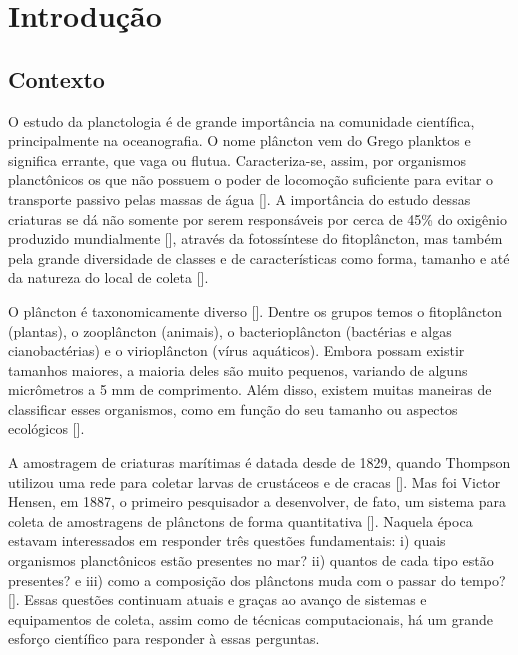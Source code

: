 \chapter{Introdução}
\label{cap:introducao}


\section{Contexto}
\label{sec:intro_contexto}



O estudo da planctologia é de grande importância na comunidade científica, principalmente na oceanografia. O nome plâncton vem do Grego planktos e significa errante, que vaga ou flutua. Caracteriza-se, assim, por organismos planctônicos os que não possuem o poder de locomoção suficiente para evitar o transporte passivo pelas massas de água [\cite{calazans2011organismos}].  A importância do estudo dessas criaturas se dá não somente por serem responsáveis por cerca de 45\% do oxigênio produzido mundialmente [\cite{brierleyplankton}],  através da fotossíntese do fitoplâncton, mas também pela grande diversidade de classes e de características como forma, tamanho e até da natureza do local de coleta [\cite{calazans2011organismos}]. 

O plâncton é taxonomicamente diverso [\cite{brierleyplankton}]. Dentre os grupos temos o fitoplâncton (plantas), o zooplâncton (animais), o bacterioplâncton (bactérias e algas cianobactérias) e o virioplâncton (vírus aquáticos). Embora possam existir tamanhos maiores, a maioria deles são muito pequenos, variando de alguns micrômetros a 5 mm de comprimento. Além disso, existem muitas maneiras de classificar esses organismos, como em função do seu tamanho ou aspectos ecológicos [\cite{calazans2011organismos}].


A amostragem de criaturas marítimas é datada desde de 1829, quando Thompson utilizou uma rede para coletar larvas de crustáceos e de cracas [\cite{brierleyplankton}]. Mas foi Victor Hensen, em 1887, o primeiro pesquisador a desenvolver, de fato, um sistema para coleta de amostragens de plânctons de forma quantitativa [\cite{benfield2007rapid, wiebe2003hensen, allen1919contribution}]. Naquela época estavam interessados em responder três questões fundamentais: i) quais organismos planctônicos estão presentes no mar? ii) quantos de cada tipo estão presentes? e iii) como a composição dos plânctons muda com o passar do tempo?  [\cite{benfield2007rapid}]. Essas questões continuam atuais e graças ao avanço de sistemas e equipamentos de coleta, assim como de técnicas computacionais, há um grande esforço científico para responder à essas perguntas.


